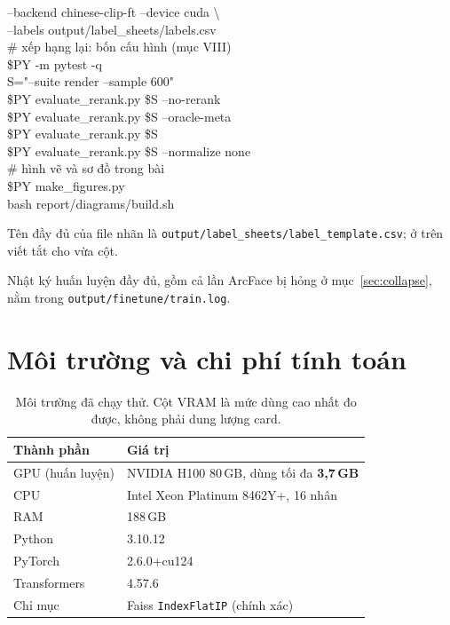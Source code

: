 \documentclass[conference,a4paper]{IEEEtran}
\newcommand{\code}[1]{{\small\texttt{#1}}}
\begin{document}
{\hspace*{1em}--backend chinese-clip-ft --device cuda \textbackslash\\
\hspace*{1em}--labels output/label\_sheets/labels.csv\\[4pt]
\# xếp hạng lại: bốn cấu hình (mục VIII)\\
\$PY -m pytest -q\\
S="--suite render --sample 600"\\
\$PY evaluate\_rerank.py \$S --no-rerank\\
\$PY evaluate\_rerank.py \$S --oracle-meta\\
\$PY evaluate\_rerank.py \$S\\
\$PY evaluate\_rerank.py \$S --normalize none\\[4pt]
\# hình vẽ và sơ đồ trong bài\\
\$PY make\_figures.py\\
bash report/diagrams/build.sh\\
}

{\sloppy Tên đầy đủ của file nhãn là \code{output/label\_sheets/label\_template.csv}; ở trên viết
tắt cho vừa cột.\par} Nhật ký huấn luyện đầy đủ, gồm cả lần ArcFace bị hỏng ở mục~\ref{sec:collapse},
nằm trong \code{output/finetune/train.log}.

\section{Môi trường và chi phí tính toán}
\label{app:env}

\begin{table}[h]
\caption{Môi trường đã chạy thử. Cột VRAM là mức dùng cao nhất đo được, không phải dung lượng card.}
\label{tab:env}
\centering\footnotesize
\begin{tabular}{@{}ll@{}}
\toprule
Thành phần & Giá trị \\
\midrule
GPU (huấn luyện) & NVIDIA H100 80\,GB, dùng tối đa \textbf{3,7\,GB} \\
CPU & Intel Xeon Platinum 8462Y+, 16 nhân \\
RAM & 188\,GB \\
Python & 3.10.12 \\
PyTorch & 2.6.0+cu124 \\
Transformers & 4.57.6 \\
Chỉ mục & Faiss \code{IndexFlatIP} (chính xác) \\
\bottomrule
\end{tabular}
\end{table}
\end{document}
